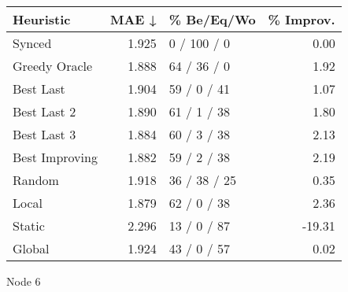 \begin{tabular}{lrlr}
\toprule
\textbf{Heuristic} & \textbf{MAE ↓} & \textbf{\% Be/Eq/Wo} & \textbf{\% Improv.} \\
\midrule
            Synced &          1.925 &          0 / 100 / 0 &                0.00 \\
     Greedy Oracle &          1.888 &          64 / 36 / 0 &                1.92 \\
         Best Last &          1.904 &          59 / 0 / 41 &                1.07 \\
       Best Last 2 &          1.890 &          61 / 1 / 38 &                1.80 \\
       Best Last 3 &          1.884 &          60 / 3 / 38 &                2.13 \\
    Best Improving &          1.882 &          59 / 2 / 38 &                2.19 \\
            Random &          1.918 &         36 / 38 / 25 &                0.35 \\
             Local &          1.879 &          62 / 0 / 38 &                2.36 \\
            Static &          2.296 &          13 / 0 / 87 &              -19.31 \\
            Global &          1.924 &          43 / 0 / 57 &                0.02 \\
\bottomrule
\end{tabular}
\caption{Node 6}
\label{tab:ds_non_lr01_le2_bs4_6}
